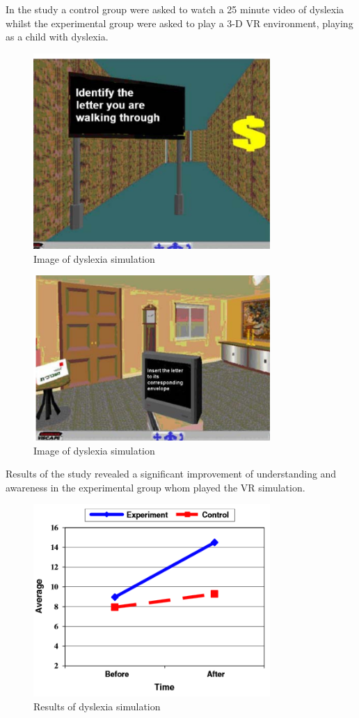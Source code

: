 \documentclass[11pt]{report}
\begin{document}
In the study\cite{dyslexicsimpar} a control group were asked to watch a 25 minute video of dyslexia whilst the experimental group were asked to play a 3-D VR environment, playing as a child with dyslexia.

\begin{figure}[H]
\centering
\includegraphics[width=90mm]{images/litreview/dsim1.png}
\caption{Image of dyslexia simulation}
\label{autisim1}
\end{figure}

\begin{figure}[H]
\centering
\includegraphics[width=90mm]{images/litreview/dsim2.png}
\caption{Image of dyslexia simulation}
\label{autisim1}
\end{figure}

Results of the study revealed a significant improvement of understanding and awareness in the experimental group whom played the VR simulation.

\begin{figure}[H]
\centering
\includegraphics[width=90mm]{images/litreview/dsimresults.png}
\caption{Results of dyslexia simulation}
\label{autisim1}
\end{figure}
\end{document}
